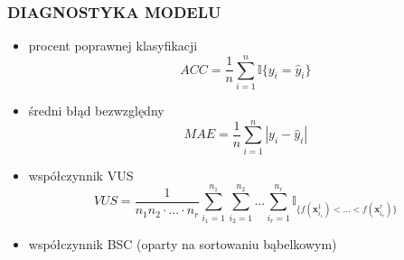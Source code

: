 \documentclass[11pt,usenames,dvipsnames,rgb,svgnames,x11names]{beamer}
\theoremstyle{plain}
\theoremstyle{definition}
\theoremstyle{remark}
\begin{document}
\begin{frame}
\frametitle{\textbf{DIAGNOSTYKA MODELU}}
\begin{itemize}
\item procent poprawnej klasyfikacji
\begin{equation*}
ACC = \frac{1}{n}\sum_{i=1}^n \mathbb{I}{\lbrace y_i=\hat{y}_i \rbrace}
\end{equation*}
\item średni błąd bezwzględny
\begin{equation*}
MAE = \frac{1}{n}\sum_{i=1}^n | y_i - \hat{y}_i | 
\end{equation*}
\item współczynnik VUS
\begin{equation*}
VUS = \dfrac{1}{n_1n_2\cdot\ldots\cdot n_r}\sum_{i_1=1}^{n_1}\sum_{i_2=1}^{n_2}\ldots\sum_{i_r=1}^{n_r}\mathbb{I}_{\lbrace f(\mathbf{x}_{i_1}^1)<\ldots<f(\mathbf{x}_{i_r}^r)\rbrace}
\end{equation*}
\item współczynnik BSC (oparty na sortowaniu bąbelkowym)
\end{itemize}
\end{frame}
\end{document}
